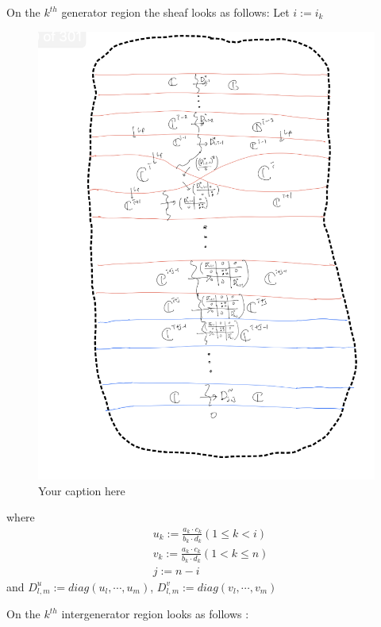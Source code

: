 On the $k^{th}$ generator region the sheaf looks as follows:
Let $i := i_k$
\begin{figure}[H] %
    \centering
    \includegraphics[width=\linewidth]{diagrams/theorem15/3.png} %
    \caption{Your caption here}
    \label{fig:your-label}
\end{figure}

where
\begin{align*}
	& u_k := \frac{a_k\cdot c_k}{b_k\cdot d_k} (1\leq k <i)\\
	& v_k := \frac{a_k\cdot c_k}{b_k\cdot d_k} (1< k \leq n)\\
	& j := n-i
\end{align*}
and $D_{l,m}^u := diag(u_l,\cdots,u_m)$, $D_{l,m}^v := diag(v_l,\cdots,v_m)$

On the $k^{th}$ intergenerator region looks as follows :

